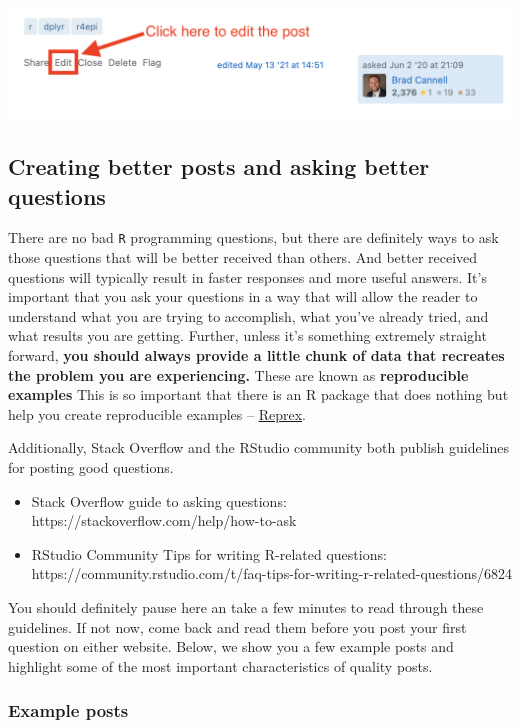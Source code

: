 \documentclass[
  letterpaper,
  DIV=11,
  numbers=noendperiod]{scrreprt}
\begin{document}
\includegraphics{chapters/asking_questions/so_4_edit.png}

\subsection{Creating better posts and asking better
questions}\label{creating-better-posts-and-asking-better-questions}

There are no bad \texttt{R} programming questions, but there are
definitely ways to ask those questions that will be better received than
others. And better received questions will typically result in faster
responses and more useful answers. It's important that you ask your
questions in a way that will allow the reader to understand what you are
trying to accomplish, what you've already tried, and what results you
are getting. Further, unless it's something extremely straight forward,
\textbf{you should always provide a little chunk of data that recreates
the problem you are experiencing.} These are known as
\textbf{reproducible examples} This is so important that there is an R
package that does nothing but help you create reproducible examples --
\href{https://reprex.tidyverse.org/}{Reprex}.

Additionally, Stack Overflow and the RStudio community both publish
guidelines for posting good questions.

\begin{itemize}
\item
  Stack Overflow guide to asking questions:
  https://stackoverflow.com/help/how-to-ask
\item
  RStudio Community Tips for writing R-related questions:
  https://community.rstudio.com/t/faq-tips-for-writing-r-related-questions/6824
\end{itemize}

You should definitely pause here an take a few minutes to read through
these guidelines. If not now, come back and read them before you post
your first question on either website. Below, we show you a few example
posts and highlight some of the most important characteristics of
quality posts.

\subsubsection{Example posts}\label{example-posts}
\end{document}
